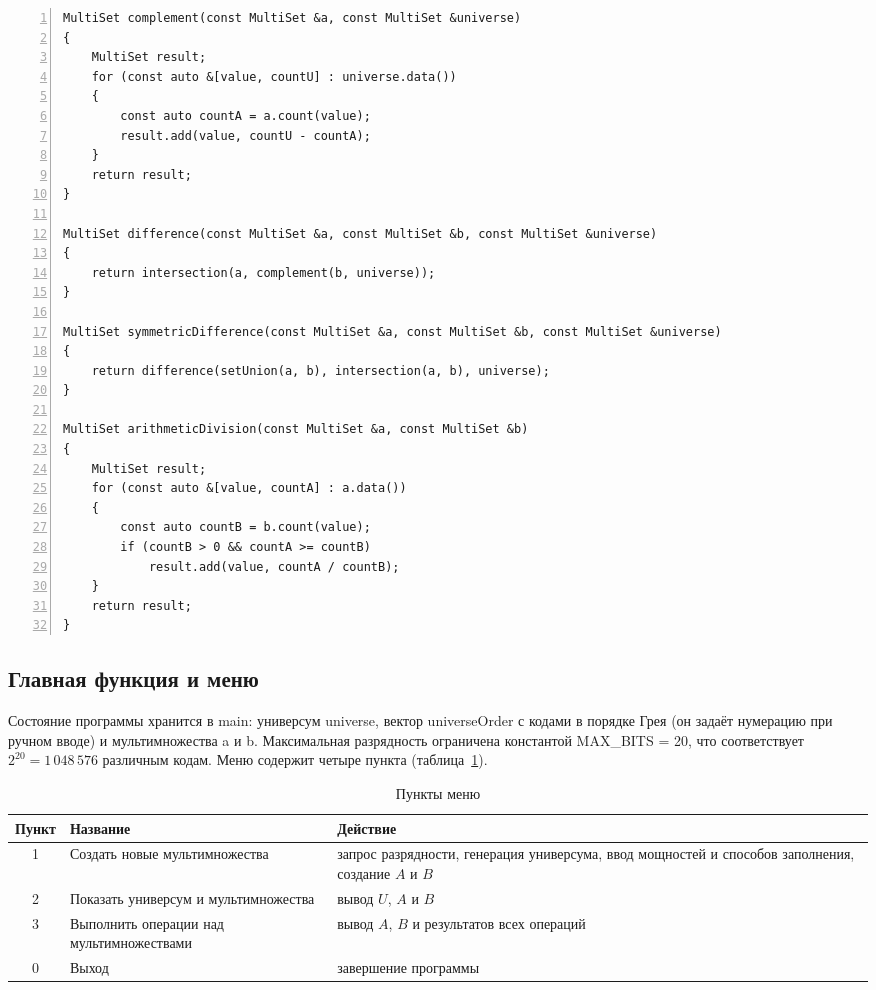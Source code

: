 \documentclass[14pt,a4paper]{extarticle}
\newcommand{\codefont}{\renewcommand{\baselinestretch}{1}\monofont\fontsize{10}{12}\selectfont}
\newcommand{\code}[1]{{\monofont #1}}
\begin{document}
\label{lst:ops}
\begin{Verbatim}[frame=single,framesep=3pt,numbers=left,numbersep=6pt,breaklines=true,tabsize=4,formatcom=\codefont,xleftmargin=18pt]
MultiSet complement(const MultiSet &a, const MultiSet &universe)
{
    MultiSet result;
    for (const auto &[value, countU] : universe.data())
    {
        const auto countA = a.count(value);
        result.add(value, countU - countA);
    }
    return result;
}

MultiSet difference(const MultiSet &a, const MultiSet &b, const MultiSet &universe)
{
    return intersection(a, complement(b, universe));
}

MultiSet symmetricDifference(const MultiSet &a, const MultiSet &b, const MultiSet &universe)
{
    return difference(setUnion(a, b), intersection(a, b), universe);
}

MultiSet arithmeticDivision(const MultiSet &a, const MultiSet &b)
{
    MultiSet result;
    for (const auto &[value, countA] : a.data())
    {
        const auto countB = b.count(value);
        if (countB > 0 && countA >= countB)
            result.add(value, countA / countB);
    }
    return result;
}
\end{Verbatim}


\subsection{Главная функция и меню}

Состояние программы хранится в \code{main}: универсум \code{universe}, вектор \code{universeOrder} с кодами в порядке Грея (он задаёт нумерацию при ручном вводе) и мультимножества \code{a} и \code{b}. Максимальная разрядность ограничена константой \code{MAX\_BITS = 20}, что соответствует $2^{20}=1\,048\,576$ различным кодам. Меню содержит четыре пункта (таблица~\ref{tab:menu}).

\begin{table}[H]
\caption{Пункты меню}\label{tab:menu}
\small\singlespacing
\begin{tabularx}{\textwidth}{@{}c>{\raggedright\arraybackslash}p{6.2cm}X@{}}
\toprule
Пункт & Название & Действие \\
\midrule
1 & Создать новые мультимножества & запрос разрядности, генерация универсума, ввод мощностей и способов заполнения, создание $A$ и $B$ \\
2 & Показать универсум и мультимножества & вывод $U$, $A$ и $B$ \\
3 & Выполнить операции над мультимножествами & вывод $A$, $B$ и результатов всех операций \\
0 & Выход & завершение программы \\
\bottomrule
\end{tabularx}
\end{table}
\end{document}
